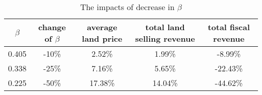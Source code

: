 \begin{table}[H]
\centering
\caption{The impacts of decrease in $\beta$}
\label{table: decrease_beta}
\begin{tabular}{ccccc}
\toprule
$\beta$ & change of $\beta$ & average land price & total land selling revenue & total fiscal revenue \\
\midrule
0.405 & -10\% & 2.52\% & 1.99\% & -8.99\% \\
0.338 & -25\% & 7.16\% & 5.65\% & -22.43\% \\
0.225 & -50\% & 17.38\% & 14.04\% & -44.62\% \\
\bottomrule
\end{tabular}
\end{table}
